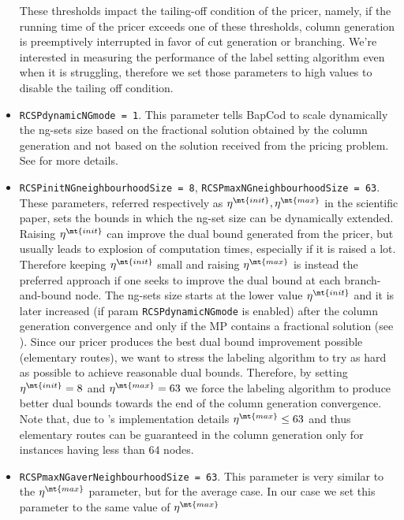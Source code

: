 \begin{itemize}
	      These thresholds impact the tailing-off condition of the pricer, namely, if the running time of the pricer exceeds one of these thresholds, column generation is preemptively interrupted in favor of cut generation or branching.
	      We're interested in measuring the performance of the label setting algorithm even when it is struggling, therefore we set those parameters to high values to disable the tailing off condition.
	\item \texttt{RCSPdynamicNGmode = 1}.
	      This parameter tells BapCod to scale dynamically
	      the ng-sets size based on the
	      fractional solution obtained by the column generation
	      and not based on the solution received from the pricing problem.
	      See \textcite{pessoa2020a} for more details.
	\item \texttt{RCSPinitNGneighbourhoodSize = 8}, \texttt{RCSPmaxNGneighbourhoodSize = 63}.
	      These parameters, referred respectively as $\eta^\mt{init}, \eta^\mt{max}$ in the scientific paper,
	      sets the bounds in which the ng-set size can be dynamically extended.
	      Raising $\eta^\mt{init}$ can improve the dual bound generated from the pricer, but usually leads to explosion of computation times, especially if it is raised a lot.
	      Therefore keeping $\eta^\mt{init}$ small and raising $\eta^\mt{max}$ is instead the preferred approach if one seeks to improve the dual bound at each branch-and-bound node.
	      The ng-sets size starts at the lower value $\eta^\mt{init}$ and it is later increased (if param \texttt{RCSPdynamicNGmode} is enabled)
	      after the column generation convergence and only if the MP contains a fractional solution (see \cite{pessoa2020a}).
	      Since our pricer produces the best dual bound improvement possible (elementary routes),
	      we want to stress the labeling algorithm to try as hard as possible to achieve
	      reasonable dual bounds.
	      Therefore, by setting $\eta^\mt{init} = 8$ and $\eta^\mt{max} = 63$
	      we force the labeling algorithm to produce better dual bounds towards the end of the column generation convergence.
	      Note that, due to \bapcod's implementation details $\eta^\mt{max} \le 63$ and thus
	      elementary routes can be guaranteed in the column generation
	      only for instances having less than $64$ nodes.
	\item \texttt{RCSPmaxNGaverNeighbourhoodSize = 63}.
	      This parameter is very similar to the $\eta^\mt{max}$ parameter, but for the average case.
	      In our case we set this parameter to the same value of $\eta^\mt{max}$

\end{itemize}
